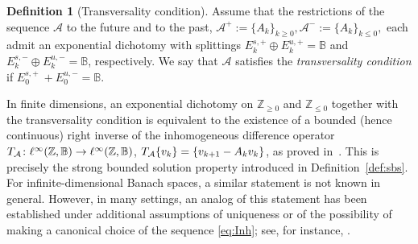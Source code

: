 \documentclass[12pt]{article}
\newcommand{\Bb}{\mathbb{B}}
\theoremstyle{definition}
\newtheorem{defin}[thm]{Definition}
\begin{document}
\begin{defin}[Transversality condition]\label{def:transversality}
Assume that the restrictions of the sequence $\mathcal{A}$ to the future and to the past,
$
{\mathcal{A}}^{+}:=\{A_k\}_{k\ge 0}, {\mathcal{A}}^{-}:=\{A_k\}_{k\le 0},
$
each admit an exponential dichotomy with splittings
$E^{s,+}_k\oplus E^{u,+}_k=\Bb$ and
$E^{s,-}_k\oplus E^{u,-}_k=\Bb$, respectively.
We say that $\mathcal{A}$ satisfies the \emph{transversality condition} if
$
E^{s,+}_0\ + E^{u,-}_0 = \Bb.
$
\end{defin}

In finite dimensions, an exponential dichotomy on
$\mathbb Z_{\ge 0}$ and $\mathbb Z_{\le 0}$ together with the transversality
condition is equivalent to the existence of a bounded (hence continuous)
right inverse of the inhomogeneous difference operator
$T_{\cal A}\colon\ell^\infty(\mathbb Z,\Bb)\to\ell^\infty(\mathbb Z,\Bb)$,
$T_{\cal A}\{v_k\}=\{v_{k+1}-A_k v_k\}$, as proved in~\cite{Pli77, Coppel}.  This is precisely the
strong bounded solution property introduced in Definition~\ref{def:sbs}.  
For infinite-dimensional Banach spaces, a similar statement is not known in general. However, in many settings, an analog of this statement has been established under additional assumptions of uniqueness or of the possibility of making a canonical choice of the sequence \eqref{eq:Inh}; see, for instance, \cite{LRS-JDDE1998, SellYou, HuyMinhCMAA2001}.
\end{document}
